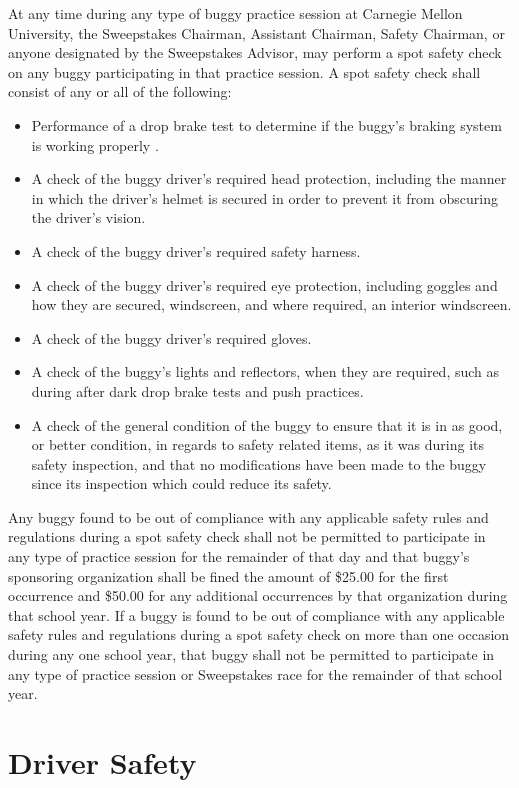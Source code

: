 At any time during any type of buggy practice session at Carnegie Mellon University, the Sweepstakes Chairman, Assistant Chairman, Safety Chairman, or anyone designated by the Sweepstakes Advisor, may perform a spot safety check on any buggy participating in that practice session. A spot safety check shall consist of any or all of the following:
\begin{itemize}
	\item Performance of a drop brake test to determine if the buggy's braking system is working properly .
	\item A check of the buggy driver's required head protection, including the manner in which the driver's helmet is secured in order to prevent it from obscuring the driver's vision.
	\item A check of the buggy driver's required safety harness.
	\item A check of the buggy driver's required eye protection, including goggles and how they are secured, windscreen, and where required, an interior windscreen.
	\item A check of the buggy driver's required gloves.
	\item A check of the buggy's lights and reflectors, when they are required, such as during after dark drop brake tests and push practices.
	\item A check of the general condition of the buggy to ensure that it is in as good, or better condition, in regards to safety related items, as it was during its safety inspection, and that no modifications have been made to the buggy since its inspection which could reduce its safety.
\end{itemize}

Any buggy found to be out of compliance with any applicable safety rules and regulations during a spot safety check shall not be permitted to participate in any type of practice session for the remainder of that day and that buggy's sponsoring organization shall be fined the amount of \$25.00 for the first occurrence and \$50.00 for any additional occurrences by that organization during that school year. If a buggy is found to be out of compliance with any applicable safety rules and regulations during a spot safety check on more than one occasion during any one school year, that buggy shall not be permitted to participate in any type of practice session or Sweepstakes race for the remainder of that school year.

\section{Driver Safety}

